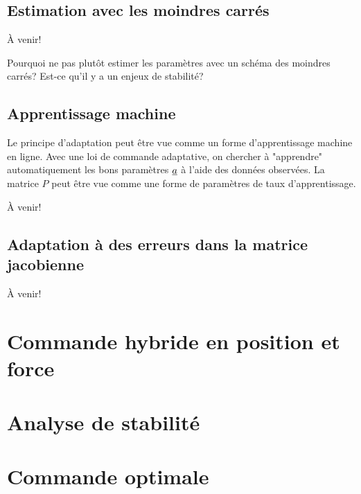 \subsection{Estimation avec les moindres carrés}

À venir!

Pourquoi ne pas plutôt estimer les paramètres avec un schéma des moindres carrés? Est-ce qu'il y a un enjeux de stabilité?

\subsection{Apprentissage machine}

Le principe d'adaptation peut être vue comme un forme d'apprentissage machine en ligne. Avec une loi de commande adaptative, on chercher à "apprendre" automatiquement les bons paramètres $\underline{a}$ à l'aide des données observées. La matrice $P$ peut être vue comme une forme de paramètres de taux d'apprentissage.

À venir!

\subsection{Adaptation à des erreurs dans la matrice jacobienne}

À venir!



\newpage
\section{Commande hybride en position et force}


\newpage
\section{Analyse de stabilité}



\newpage
\section{Commande optimale}



